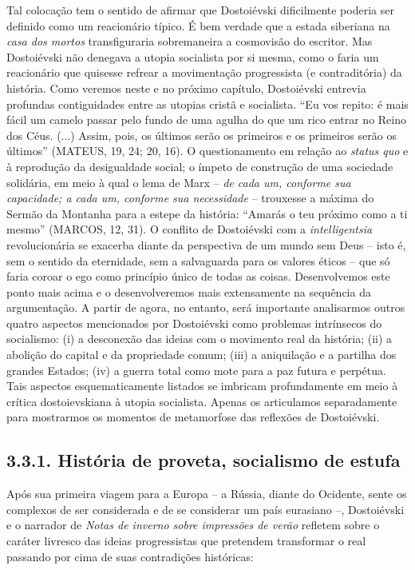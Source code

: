 Tal colocação tem o sentido de afirmar que Dostoiévski dificilmente
poderia ser definido como um reacionário típico. É bem verdade que a
estada siberiana na \emph{casa dos mortos} transfiguraria sobremaneira a
cosmovisão do escritor. Mas Dostoiévski não denegava a utopia socialista
por si mesma, como o faria um reacionário que quisesse refrear a
movimentação progressista (e contraditória) da história. Como veremos
neste e no próximo capítulo, Dostoiévski entrevia profundas
contiguidades entre as utopias cristã e socialista. ``Eu vos repito: é
mais fácil um camelo passar pelo fundo de uma agulha do que um rico
entrar no Reino dos Céus. (...) Assim, pois, os últimos serão os
primeiros e os primeiros serão os últimos'' (MATEUS, 19, 24; 20, 16). O
questionamento em relação ao \emph{status quo} e à reprodução da
desigualdade social; o ímpeto de construção de uma sociedade solidária,
em meio à qual o lema de Marx -- \emph{de cada um, conforme sua
capacidade; a cada um, conforme sua necessidade} -- trouxesse a máxima
do Sermão da Montanha para a estepe da história: ``Amarás o teu próximo
como a ti mesmo'' (MARCOS, 12, 31). O conflito de Dostoiévski com a
\emph{intelligentsia} revolucionária se exacerba diante da perspectiva
de um mundo sem Deus -- isto é, sem o sentido da eternidade, sem a
salvaguarda para os valores éticos -- que só faria coroar o ego como
princípio único de todas as coisas. Desenvolvemos este ponto mais acima
e o desenvolveremos mais extensamente na sequência da argumentação. A
partir de agora, no entanto, será importante analisarmos outros quatro
aspectos mencionados por Dostoiévski como problemas intrínsecos do
socialismo: (i) a desconexão das ideias com o movimento real da
história; (ii) a abolição do capital e da propriedade comum; (iii) a
aniquilação e a partilha dos grandes Estados; (iv) a guerra total como
mote para a paz futura e perpétua. Tais aspectos esquematicamente
listados se imbricam profundamente em meio à crítica dostoievskiana à
utopia socialista. Apenas os articulamos separadamente para mostrarmos
os momentos de metamorfose das reflexões de Dostoiévski.

\subsection{3.3.1. História de proveta, socialismo de estufa}

Após sua primeira viagem para a Europa -- a Rússia, diante do Ocidente,
sente os complexos de ser considerada e de se considerar um país
eurasiano --, Dostoiévski e o narrador de \emph{Notas de inverno sobre
impressões de verão} refletem sobre o caráter livresco das ideias
progressistas que pretendem transformar o real passando por cima de suas
contradições históricas:


